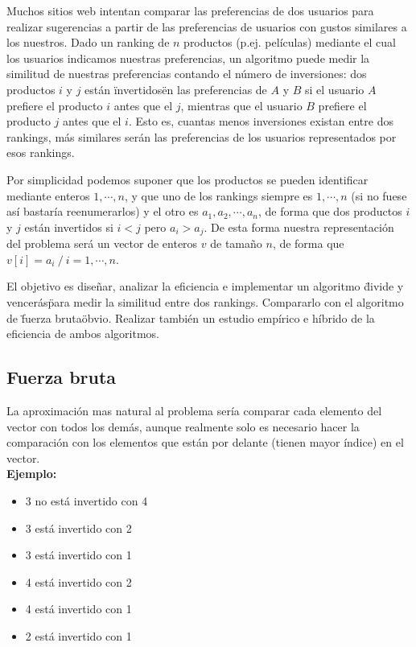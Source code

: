 
Muchos sitios web intentan comparar las preferencias de dos usuarios para realizar sugerencias a partir de las preferencias de usuarios con gustos similares a los nuestros. Dado un ranking de $n$ productos (p.ej. pel\'iculas) mediante el cual los usuarios indicamos nuestras preferencias, un algoritmo puede medir la similitud de nuestras preferencias contando el n\'umero de inversiones: dos productos $i$ y $j$ est\'an \"invertidos\" en las preferencias de $A$ y $B$ si el usuario $A$ prefiere el producto $i$ antes que el $j$, mientras que el usuario $B$ prefiere el producto $j$ antes que el $i$. Esto es, cuantas menos inversiones existan entre dos rankings, m\'as similares ser\'an las
preferencias de los usuarios representados por esos rankings.

Por simplicidad podemos suponer que los productos se pueden identificar mediante enteros
$1, \cdots, n$, y que uno de los rankings siempre es $1,\cdots, n$ (si no fuese as\'i bastar\'ia reenumerarlos) y el otro es $a_1, a_2, \cdots, a_n$, de forma que dos productos $i$ y $j$ est\'an invertidos si $i < j$ pero $a_i > a_j$.
De esta forma nuestra representaci\'on del problema ser\'a un vector de enteros $v$ de tamaño $n$, de forma que $v[i] = a_i\ / \ i = 1, \cdots, n$.

El objetivo es diseñar, analizar la eficiencia e implementar un algoritmo \"divide y vencer\'as\" para medir la similitud entre dos rankings. Compararlo con el algoritmo de \"fuerza bruta\" obvio. Realizar tambi\'en un estudio emp\'irico e h\'ibrido de la eficiencia de ambos algoritmos.

\subsection{Fuerza bruta}
La aproximación mas natural al problema sería comparar cada elemento del vector con todos los demás, aunque realmente solo es necesario hacer la comparación con los elementos que están por delante (tienen mayor índice) en el vector.\\

\textbf{Ejemplo:}

\begin{center}
\end{center}

\begin{itemize}
\item 3 no está invertido con 4
\item 3 está invertido con 2
\item 3 está invertido con 1
\item 4 está invertido con 2
\item 4 está invertido con 1
\item 2 está invertido con 1
\end{itemize}

